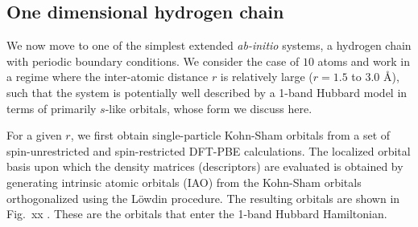 \subsection{One dimensional hydrogen chain}
We now move to one of the simplest extended \emph{ab-initio} systems, a hydrogen chain with periodic boundary conditions. 
We consider the case of $10$ atoms and work in a regime where the inter-atomic distance $r$ is 
relatively large ($r=1.5$ to $3.0$ \AA), such that the system is potentially well described by a 1-band Hubbard model 
in terms of primarily $s$-like orbitals, whose form we discuss here. 


For a given $r$, we first obtain single-particle Kohn-Sham orbitals from a set of spin-unrestricted and 
spin-restricted DFT-PBE calculations. The localized orbital basis upon which the density matrices (descriptors) 
are evaluated is obtained by generating intrinsic atomic orbitals (IAO) from the Kohn-Sham orbitals 
orthogonalized using the L\"owdin procedure. The resulting orbitals are shown in Fig.~xx . These are the orbitals that enter the 1-band Hubbard Hamiltonian. 

